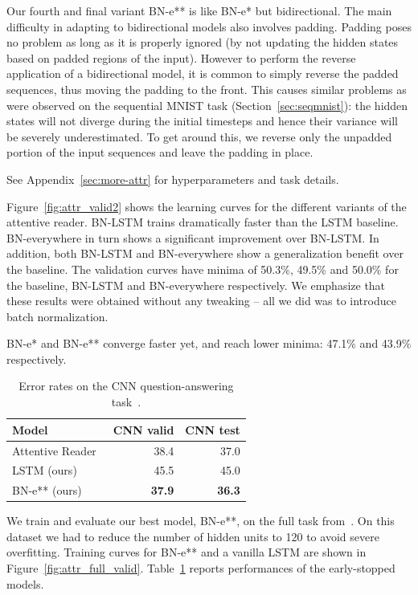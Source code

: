 \documentclass{article} %
\begin{document}
Our fourth and final variant BN-e** is like BN-e* but bidirectional.  The main
difficulty in adapting to bidirectional models also involves padding.  Padding
poses no problem as long as it is properly ignored (by not updating the hidden
states based on padded regions of the input).  However to perform the reverse
application of a bidirectional model, it is common to simply reverse the padded
sequences, thus moving the padding to the front.  This causes similar problems
as were observed on the sequential MNIST task (Section~\ref{sec:seqmnist}): the
hidden states will not diverge during the initial timesteps and hence their
variance will be severely underestimated.  To get around this, we reverse only
the unpadded portion of the input sequences and leave the padding in place.

See Appendix~\ref{sec:more-attr} for hyperparameters and task details.

Figure~\ref{fig:attr_valid2} shows the learning curves for the different
variants of the attentive reader.  BN-LSTM trains dramatically faster than the
LSTM baseline.  BN-everywhere in turn shows a significant improvement over
BN-LSTM.  In addition, both BN-LSTM and BN-everywhere show a generalization
benefit over the baseline.  The validation curves have minima of 50.3\%, 49.5\%
and 50.0\% for the baseline, BN-LSTM and BN-everywhere respectively.  We
emphasize that these results were obtained without any tweaking -- all we did
was to introduce batch normalization.

BN-e* and BN-e** converge faster yet, and reach lower minima: 47.1\% and 43.9\%
respectively.

\begin{table}[!hb]
  \center
  \begin{tabular}{@{}lrr@{}}
  \toprule
  \bf Model & \bf CNN valid & \bf CNN test \\
  \midrule
  Attentive Reader~\citep{attentivereader} & 38.4 & 37.0 \\
  \midrule
  LSTM (ours) & 45.5 & 45.0 \\
  BN-e** (ours) & \textbf{37.9} & \textbf{36.3} \\
  \bottomrule
\end{tabular}
\caption{Error rates on the CNN question-answering task~\citet{attentivereader}.}
\label{tab:attr_full}
\end{table}

We train and evaluate our best model, BN-e**, on the full task from~\citep{attentivereader}.
On this dataset we had to reduce the number of hidden units to 120 to avoid severe overfitting.
Training curves for BN-e** and a vanilla LSTM are shown in Figure~\ref{fig:attr_full_valid}.
Table~\ref{tab:attr_full} reports performances of the early-stopped models.
\end{document}
